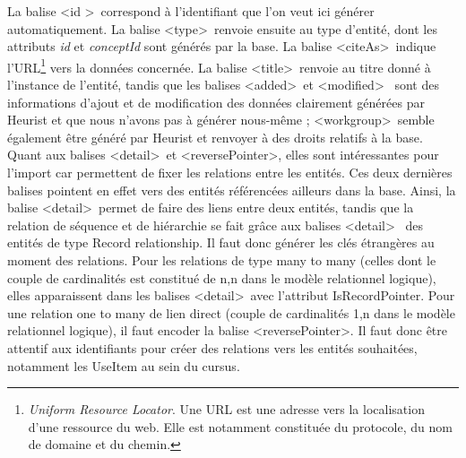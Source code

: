 \documentclass[a4paper,12pt,twoside]{book}
\begin{document}
La balise \textless id \textgreater~correspond à l'identifiant que l'on veut ici générer automatiquement. La balise \textless type\textgreater~renvoie ensuite au type d'entité, dont les attributs \textit{id} et \textit{conceptId} sont générés par la base. La balise \textless citeAs\textgreater~indique l'URL\footnote{\textit{Uniform Resource Locator}. Une URL est une adresse vers la localisation d'une ressource du web. Elle est notamment constituée du protocole, du nom de domaine et du chemin.} vers la données concernée. La balise \textless title\textgreater~renvoie au titre donné à l'instance de l'entité, tandis que les balises \textless added\textgreater~et \textless modified\textgreater~ sont des informations d'ajout et de modification des données clairement générées par Heurist et que nous n'avons pas à générer nous-même ; \textless workgroup\textgreater~semble également être généré par Heurist et renvoyer à des droits relatifs à la base. Quant aux balises \textless detail\textgreater~et \textless reversePointer\textgreater , elles sont intéressantes pour l'import car permettent de fixer les relations entre les entités. Ces deux dernières balises pointent en effet vers des entités référencées ailleurs dans la base. Ainsi, la balise \textless detail\textgreater~permet de faire des liens entre deux entités, tandis que la relation de séquence et de hiérarchie se fait grâce aux balises \textless detail\textgreater
~des entités de type \og Record relationship\fg{}. Il faut donc générer les clés étrangères au moment des relations. Pour les relations de type \og many to many\fg{} (celles dont le couple de cardinalités est constitué de n,n dans le modèle relationnel logique), elles apparaissent dans les balises \textless detail\textgreater~avec l’attribut IsRecordPointer. Pour une relation \og one to many\fg{} de lien direct (couple de cardinalités 1,n dans le modèle relationnel logique), il faut encoder la balise \textless reversePointer\textgreater. Il faut donc 
être attentif aux identifiants pour créer des relations vers les entités souhaitées, notamment les UseItem au sein du cursus.\\
\end{document}
